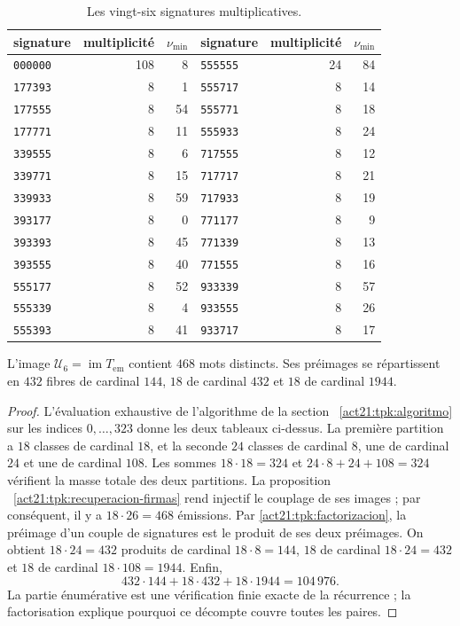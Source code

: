 \begin{minipage}{\linewidth}
\begin{table}[H]
\caption{Les vingt-six signatures multiplicatives.}
\label{act21:tpk:firmas-multiplicativas}
\begin{tabular}{@{}lrr@{\qquad}lrr@{}}
\toprule
signature&multiplicité&\(\nu_{\min}\)&signature&multiplicité&\(\nu_{\min}\)\\
\midrule
\texttt{000000}&108&8&\texttt{555555}&24&84\\
\texttt{177393}&8&1&\texttt{555717}&8&14\\
\texttt{177555}&8&54&\texttt{555771}&8&18\\
\texttt{177771}&8&11&\texttt{555933}&8&24\\
\texttt{339555}&8&6&\texttt{717555}&8&12\\
\texttt{339771}&8&15&\texttt{717717}&8&21\\
\texttt{339933}&8&59&\texttt{717933}&8&19\\
\texttt{393177}&8&0&\texttt{771177}&8&9\\
\texttt{393393}&8&45&\texttt{771339}&8&13\\
\texttt{393555}&8&40&\texttt{771555}&8&16\\
\texttt{555177}&8&52&\texttt{933339}&8&57\\
\texttt{555339}&8&4&\texttt{933555}&8&26\\
\texttt{555393}&8&41&\texttt{933717}&8&17\\
\bottomrule
\end{tabular}
\end{table}
\end{minipage}\par


\begin{proposition}
\label{act21:tpk:468}
L'image \(\mathcal U_6=\operatorname{im}T_{\mathrm{em}}\) contient
\(468\) mots distincts. Ses préimages se répartissent en \(432\)
fibres de cardinal \(144\), \(18\) de cardinal \(432\) et \(18\) de
cardinal \(1944\).
\end{proposition}
\begin{proof}
L'évaluation exhaustive de l'algorithme de la section ~\ref{act21:tpk:algoritmo} sur les indices \(0,\ldots,323\) donne les deux tableaux ci-dessus. La première partition a \(18\) classes de cardinal \(18\), et la seconde \(24\) classes de cardinal \(8\), une de cardinal \(24\) et une de cardinal \(108\). Les sommes \(18\cdot18=324\) et \(24\cdot8+24+108=324\) vérifient la masse totale des deux partitions. La proposition ~\ref{act21:tpk:recuperacion-firmas} rend injectif le couplage de ses images ; par conséquent, il y a \(18\cdot26=468\) émissions. Par \eqref{act21:tpk:factorizacion}, la préimage d'un couple de signatures est le produit de ses deux préimages. On obtient \(18\cdot24=432\) produits de cardinal \(18\cdot8=144\), \(18\) de cardinal \(18\cdot24=432\) et \(18\) de cardinal \(18\cdot108=1944\). Enfin,
\[
 432\cdot144+18\cdot432+18\cdot1944=104\,976.
\]
La partie énumérative est une vérification finie exacte de la récurrence ;
la factorisation explique pourquoi ce décompte couvre toutes les paires.
\end{proof}

